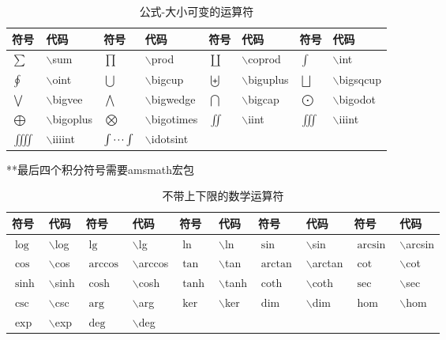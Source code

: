 \documentclass[UTF8,fontset=ubuntu]{ctexart}
\begin{document}
\begin{table}
\begin{tabular}{l l l l l l l l}
	\hline
	符号 & 代码 & 符号 & 代码 & 符号 & 代码 & 符号 & 代码\\
	\hline
	$\sum$ & $\backslash$sum & $\prod$ & $\backslash$prod & $\coprod$ & $\backslash$coprod & $\int$ & $\backslash$int\\
	$\oint$ & $\backslash$oint & $\bigcup$ & $\backslash$bigcup & $\biguplus$ & $\backslash$biguplus & $\bigsqcup$ & $\backslash$bigsqcup\\
	$\bigvee$ & $\backslash$bigvee & $\bigwedge$ & $\backslash$bigwedge & $\bigcap$ & $\backslash$bigcap & $\bigodot$ & $\backslash$bigodot\\
	$\bigoplus$ & $\backslash$bigoplus & $\bigotimes$ & $\backslash$bigotimes & $\iint$ & $\backslash$iint & $\iiint$ & $\backslash$iiint\\
	$\iiiint$ & $\backslash$iiiint & $\idotsint$ & $\backslash$idotsint\\
	\hline
\end{tabular}
**最后四个积分符号需要amsmath宏包
\caption{公式-大小可变的运算符}
\end{table}
\begin{table}
\begin{tabular}{l l l l l l l l l l}
	\hline
	符号 & 代码 & 符号 & 代码 & 符号 & 代码 & 符号 & 代码 & 符号 & 代码\\
	\hline
	$\log$ & $\backslash$log & $\lg$ & $\backslash$lg & $\ln$ & $\backslash$ln & $\sin$ & $\backslash$sin & $\arcsin$ & $\backslash$arcsin\\
	$\cos$ & $\backslash$cos & $\arccos$ & $\backslash$arccos & $\tan$ & $\backslash$tan & $\arctan$ & $\backslash$arctan & $\cot$ & $\backslash$cot\\
	$\sinh$ & $\backslash$sinh & $\cosh$ & $\backslash$cosh & $\tanh$ & $\backslash$tanh & $\coth$ & $\backslash$coth & $\sec$ & $\backslash$sec\\
	$\csc$ & $\backslash$csc & $\arg$ & $\backslash$arg & $\ker$ & $\backslash$ker & $\dim$ & $\backslash$dim & $\hom$ & $\backslash$hom\\
	$\exp$ & $\backslash$exp & $\deg$ & $\backslash$deg\\
	\hline
\end{tabular}
\caption{不带上下限的数学运算符}
\end{table}
\end{document}
